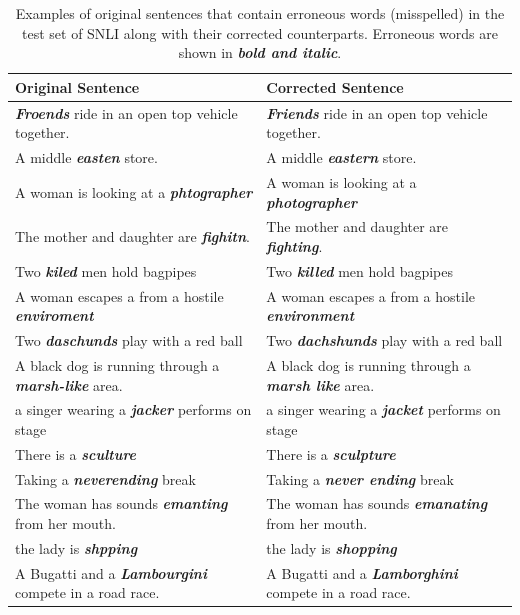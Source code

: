 \documentclass[11pt,a4paper]{article}
\begin{document}
	\begin{table}[ht]
		\begin{center}
			\small
			\begin{tabular}{ll}
				\hline
				\textbf{Original Sentence} & \textbf{Corrected Sentence}  \\ \hline\hline
				\textbf{\textit{Froends}} ride in an open top vehicle together. & \textbf{\textit{Friends}} ride in an open top vehicle together. \\
				A middle \textbf{\textit{easten}} store. & A middle \textbf{\textit{eastern}} store. \\
				A woman is looking at a \textbf{\textit{phtographer}} & A woman is looking at a \textbf{\textit{photographer}} \\
				The mother and daughter are \textbf{\textit{fighitn}}. & The mother and daughter are \textbf{\textit{fighting}}. \\
				Two \textbf{\textit{kiled}} men hold bagpipes & Two \textbf{\textit{killed}} men hold bagpipes \\
				A woman escapes a from a hostile \textbf{\textit{enviroment}} & A woman escapes a from a hostile \textbf{\textit{environment}} \\
				Two \textbf{\textit{daschunds}} play with a red ball & Two \textbf{\textit{dachshunds}} play with a red ball \\
				A black dog is running through a \textbf{\textit{marsh-like}} area. & A black dog is running through a \textbf{\textit{marsh like}} area. \\
				a singer wearing a \textbf{\textit{jacker}} performs on stage & a singer wearing a \textbf{\textit{jacket}} performs on stage \\
				There is a \textbf{\textit{sculture}} & There is a \textbf{\textit{sculpture}} \\
				Taking a \textbf{\textit{neverending}} break & Taking a \textbf{\textit{never ending}} break \\
				The woman has sounds \textbf{\textit{emanting}} from her mouth. & The woman has sounds \textbf{\textit{emanating}} from her mouth. \\
				the lady is \textbf{\textit{shpping}} & the lady is \textbf{\textit{shopping}} \\
				A Bugatti and a \textbf{\textit{Lambourgini}} compete in a road race. & A Bugatti and a \textbf{\textit{Lamborghini}} compete in a road race.  \\ \hline
			\end{tabular}
		\end{center}
		\caption{\label{tab:mis:data} Examples of original sentences that contain erroneous words (misspelled) in the test set of SNLI along with their corrected counterparts. Erroneous words are shown in \textbf{\textit{bold and italic}}.}
	\end{table}
	
\end{document}
